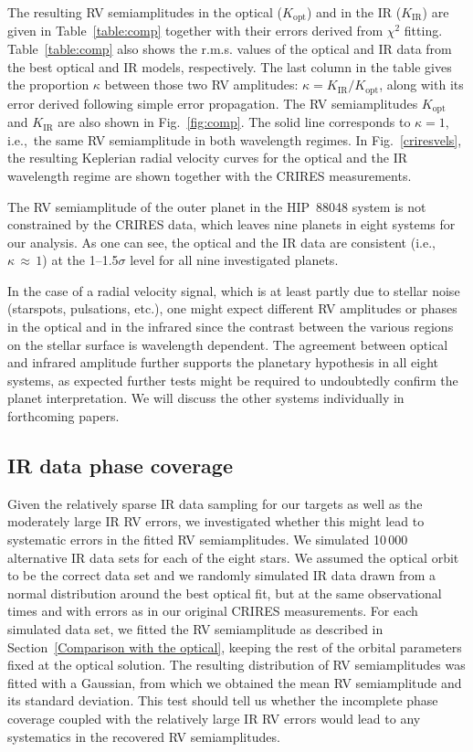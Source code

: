 \documentclass{aa}
\begin{document}
The resulting RV semiamplitudes in the optical ($K_{\mathrm{opt}}$) and in the IR ($K_{\mathrm{IR}}$) are
given in Table~\ref{table:comp} together with their errors derived from
$\chi^2$ fitting. Table~\ref{table:comp} also shows the r.m.s. values of the optical and IR 
data from the best optical and IR models, respectively.
The last column in the table gives the proportion $\kappa$ 
between those two RV amplitudes: $\kappa = K_{\mathrm{IR}}/K_{\mathrm{opt}}$, 
along with its error derived following simple error propagation.
The RV semiamplitudes $K_{\mathrm{opt}}$ and $K_{\mathrm{IR}}$ are also
shown in Fig.~\ref{fig:comp}. The solid line corresponds to $\kappa=1$, i.e.,\
the same RV semiamplitude in both wavelength regimes. 
In Fig.~\ref{criresvels}, the resulting Keplerian radial velocity curves for the
optical and the IR wavelength regime are shown together with the CRIRES measurements. 

The RV semiamplitude of the outer planet in the HIP~88048 system is not constrained 
by the CRIRES data, which leaves nine planets in eight systems for our analysis.
As one can see, the optical and the IR data are consistent (i.e.,
$\kappa\,\approx\,1$) at the 1--1.5$\sigma$ level for all nine investigated planets. 

In the case of a radial velocity signal, which is at least partly due to stellar
noise (starspots, pulsations, etc.), one might expect different RV amplitudes or
phases in the optical and in the infrared since the contrast between the 
various regions on the stellar surface is wavelength dependent.
The agreement between optical and infrared amplitude further supports the 
planetary hypothesis in all eight systems, as expected further tests might be required to
undoubtedly confirm the planet interpretation. 
We will discuss the other systems individually in forthcoming papers.




\subsection{IR data phase coverage}
\label{phase coverage}

Given the relatively sparse IR data sampling for our targets 
 as well as the moderately large IR RV errors, we investigated
whether this might lead to systematic errors in the fitted RV semiamplitudes.
We simulated 10\,000 alternative IR data sets for each of the eight stars.
We assumed the optical orbit to be the correct data set and we randomly 
simulated IR data drawn from a normal distribution around the best
optical fit, but 
at the same observational times and with errors as in our original CRIRES measurements.
For each simulated data set, we fitted the RV semiamplitude as described in
Section~\ref{Comparison with the optical},
keeping the rest of the orbital parameters fixed at the optical solution.
The resulting distribution of RV semiamplitudes was fitted  
with a Gaussian, from which we obtained the mean RV semiamplitude and its standard deviation.
 This test should tell us whether the incomplete phase coverage coupled with the
relatively large IR RV errors would lead to any systematics in the recovered RV semiamplitudes.
\end{document}
